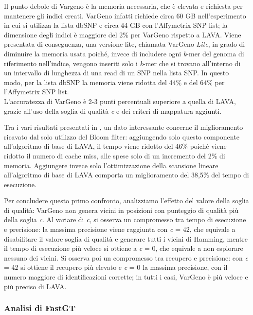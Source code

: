 \documentclass[../main.tex]{subfiles}
\begin{document}
Il punto debole di Vargeno è la memoria necessaria, che è elevata e richiesta per mantenere gli indici creati. VarGeno infatti richiede circa 60 GB nell'esperimento in cui si utilizza la lista dbSNP e circa 44 GB con l'Affymetrix SNP list; la dimensione degli indici è maggiore del 2\% per VarGeno rispetto a LAVA. Viene presentata di conseguenza, una versione lite, chiamata VarGeno \textit{Lite}, in grado di diminuire la memoria usata poiché, invece di includere ogni \textit{k}-mer del genoma di riferimento nell'indice, vengono inseriti solo i \textit{k}-mer che si trovano all'interno di un intervallo di lunghezza di una read di un SNP nella lista SNP. In questo modo, per la lista dbSNP la memoria viene ridotta del 44\% e del 64\% per l'Affymetrix SNP list.\\

\noindent
L'accuratezza di VarGeno è 2-3 punti percentuali superiore a quella di LAVA, grazie all'uso della soglia di qualità \textit{c} e dei criteri di mappatura aggiunti. 

Tra i vari risultati presentati in \cite{sun-medvedev2018vargeno}, un dato interessante concerne il miglioramento ricavato dal solo utilizzo del Bloom filter: aggiungendo solo questo componente all'algoritmo di base di LAVA, il tempo viene ridotto del 46\% poiché viene ridotto il numero di cache miss, alle spese solo di un incremento del 2\% di memoria. Aggiungere invece solo l'ottimizzazione della scansione lineare all'algoritmo di base di LAVA comporta un miglioramento del 38,5\% del tempo di esecuzione. 

Per concludere questo primo confronto, analizziamo l'effetto del valore della soglia di qualità: VarGeno non genera vicini in posizioni con punteggio di qualità più della soglia \textit{c}. Al variare di \textit{c}, si osserva un compromesso tra tempo di esecuzione e precisione: la massima precisione viene raggiunta con \textit{c} = 42, che equivale a disabilitare il valore soglia di qualità e generare tutti i vicini di Hamming, mentre il tempo di esecuzione più veloce si ottiene a \textit{c} = 0, che equivale a non esplorare nessuno dei vicini. Si osserva poi un compromesso tra recupero e precisione: con \textit{c} = 42 si ottiene il recupero più elevato e \textit{c} = 0 la massima precisione, con il numero maggiore di identificazioni corrette; in tutti i casi, VarGeno è più veloce e più preciso di LAVA. 


\subsubsection{Analisi di FastGT}
\end{document}
